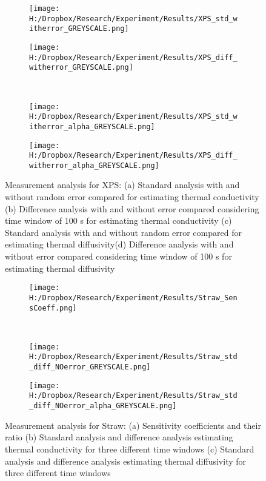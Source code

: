 \documentclass[12pt]{report}
\begin{document}
\begin{figure}
\begin{subfigure}{.5\textwidth}
\centering
\texttt{[image: H:/Dropbox/Research/Experiment/Results/XPS\_std\_witherror\_GREYSCALE.png]}
\caption{}
\end{subfigure}\hfill
\begin{subfigure}{.5\textwidth}
\centering
\texttt{[image: H:/Dropbox/Research/Experiment/Results/XPS\_diff\_witherror\_GREYSCALE.png]}
\caption{}
\end{subfigure}\\
\begin{subfigure}{.5\textwidth}
\centering
\texttt{[image: H:/Dropbox/Research/Experiment/Results/XPS\_std\_witherror\_alpha\_GREYSCALE.png]}
\caption{}
\end{subfigure}\hfill
\begin{subfigure}{.5\textwidth}
\centering
\texttt{[image: H:/Dropbox/Research/Experiment/Results/XPS\_diff\_witherror\_alpha\_GREYSCALE.png]}
\caption{}
\end{subfigure}
\caption{Measurement analysis for XPS: (a) Standard analysis with and without random error compared for estimating thermal conductivity (b) Difference analysis with and without error compared considering time window of 100 s for estimating thermal conductivity (c) Standard analysis with and without random error compared for estimating thermal diffusivity(d) Difference analysis with and without error compared considering time window of 100 s for estimating thermal diffusivity}
\label{pic:xps2}
\end{figure}



\begin{figure}
\begin{subfigure}{1\textwidth}
\centering
\texttt{[image: H:/Dropbox/Research/Experiment/Results/Straw\_SensCoeff.png]}
\caption{}
\end{subfigure}\\
\begin{subfigure}{.5\textwidth}
\centering
\texttt{[image: H:/Dropbox/Research/Experiment/Results/Straw\_std\_diff\_NOerror\_GREYSCALE.png]}
\caption{}
\end{subfigure}\hfill
\begin{subfigure}{.5\textwidth}
\centering
\texttt{[image: H:/Dropbox/Research/Experiment/Results/Straw\_std\_diff\_NOerror\_alpha\_GREYSCALE.png]}
\caption{}
\end{subfigure}
\caption{Measurement analysis for Straw: (a) Sensitivity coefficients and their ratio (b) Standard analysis and difference analysis estimating thermal conductivity for three different time windows (c) Standard analysis and difference analysis estimating thermal diffusivity for three different time windows}
\label{pic:straw1}
\end{figure}
\end{document}
